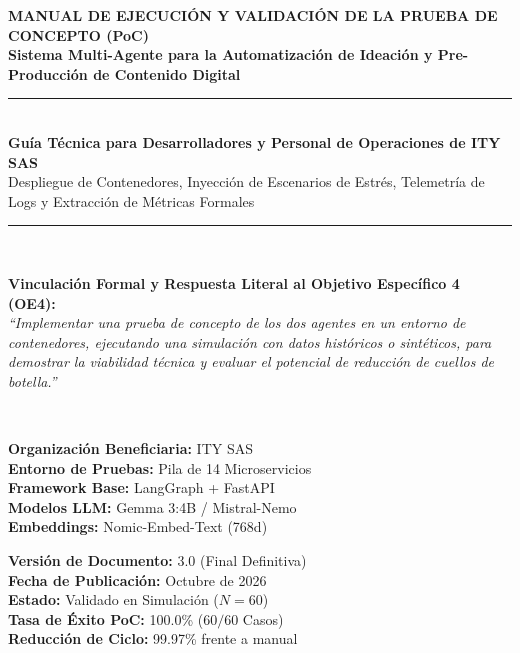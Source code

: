\documentclass[11pt,a4paper]{article}
\begin{document}
\begin{titlepage}
    \centering
    \vspace*{0.5cm}
    
    {\Huge \textbf{\color{primaryblue} MANUAL DE EJECUCIÓN Y VALIDACIÓN DE LA PRUEBA DE CONCEPTO (PoC)}}\\[0.5em]
    {\LARGE \textbf{\color{secondaryblue} Sistema Multi-Agente para la Automatización de Ideación y Pre-Producción de Contenido Digital}}\\[1.5em]
    
    \rule{\linewidth}{1.5pt}\\[1.0em]
    
    {\Large \textbf{Guía Técnica para Desarrolladores y Personal de Operaciones de ITY SAS}}\\[0.4em]
    {\large Despliegue de Contenedores, Inyección de Escenarios de Estrés, Telemetría de Logs y Extracción de Métricas Formales}\\[1.0em]
    
    \rule{\linewidth}{1.5pt}\\[2.0em]
    
    \begin{minipage}{0.9\textwidth}
        \centering
        \textbf{\color{darkgray} Vinculación Formal y Respuesta Literal al Objetivo Específico 4 (OE4):}\\[0.5em]
        \textit{``Implementar una prueba de concepto de los dos agentes en un entorno de contenedores, ejecutando una simulación con datos históricos o sintéticos, para demostrar la viabilidad técnica y evaluar el potencial de reducción de cuellos de botella.''}
    \end{minipage}\\[2.5em]
    
    \begin{minipage}{0.48\textwidth}
        \flushleft
        \textbf{Organización Beneficiaria:} ITY SAS\\
        \textbf{Entorno de Pruebas:} Pila de 14 Microservicios\\
        \textbf{Framework Base:} LangGraph + FastAPI\\
        \textbf{Modelos LLM:} Gemma 3:4B / Mistral-Nemo\\
        \textbf{Embeddings:} Nomic-Embed-Text (768d)
    \end{minipage}
    \begin{minipage}{0.48\textwidth}
        \flushright
        \textbf{Versión de Documento:} 3.0 (Final Definitiva)\\
        \textbf{Fecha de Publicación:} Octubre de 2026\\
        \textbf{Estado:} Validado en Simulación ($N=60$)\\
        \textbf{Tasa de Éxito PoC:} 100.0\% ($60/60$ Casos)\\
        \textbf{Reducción de Ciclo:} 99.97\% frente a manual
    \end{minipage}
    

\end{titlepage}
\end{document}
